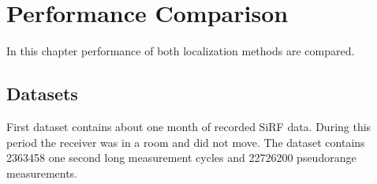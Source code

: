 \chapter{Performance Comparison}
\label{chap:performance}

In this chapter performance of both localization methods are compared.

\section{Datasets}
First dataset contains about one month of recorded SiRF data.
During this period the receiver was in a room and did not move. 
The dataset contains \num{2363458} one second long measurement cycles and
\num{22726200} pseudorange measurements.
